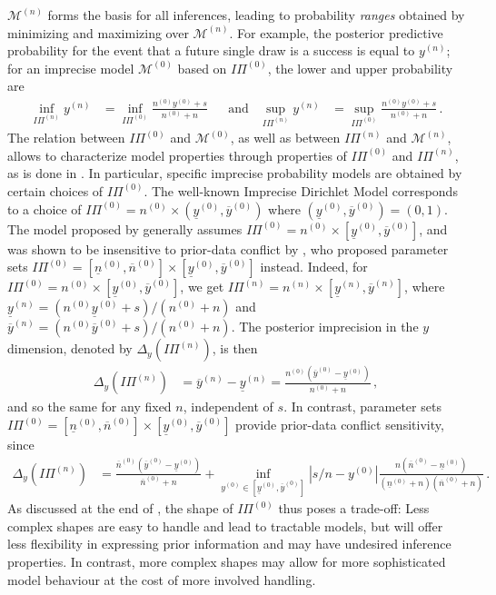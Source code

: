 \documentclass[runningheads,a4paper]{llncs}
\newcommand{\uz}{^{(0)}} %
\newcommand{\un}{^{(n)}} %
\newcommand{\ul}[1]{\underline{#1}}
\newcommand{\ol}[1]{\overline{#1}}
\def\yz{y\uz}
\def\yn{y\un}
\def\yzl{\ul{y}\uz}
\def\yzu{\ol{y}\uz}
\def\ynl{\ul{y}\un}
\def\ynu{\ol{y}\un}
\def\nz{n\uz}
\def\nn{n\un}
\def\nzl{\ul{n}\uz}
\def\nzu{\ol{n}\uz}
\def\PZ{I\!\!\Pi\uz}
\def\PN{I\!\!\Pi\un}
\def\MZ{\mathcal{M}\uz}
\def\MN{\mathcal{M}\un}
\begin{document}
$\MN$ forms the basis for all inferences,
leading to probability \emph{ranges} obtained by minimizing and maximizing over $\MN$.
For example, %
the posterior predictive probability %
for the event that a future single draw is a success is equal to $\yn$;
for an imprecise model $\MZ$ based on $\PZ$,
the lower and upper probability are
\begin{align*}
\inf_{\PN} \yn &= \inf_{\PZ} \frac{\nz\yz + s}{\nz +n} & &\text{and} &
\sup_{\PN} \yn &= \sup_{\PZ} \frac{\nz\yz + s}{\nz +n}\,.
\end{align*}
%
The relation between $\PZ$ and $\MZ$, as well as between $\PN$ and $\MN$,
allows to characterize model properties through properties of $\PZ$ and $\PN$,
as is done in \cite[\S 3.1.2 -- 3.1.4]{2013:diss-gw}.
In particular, specific imprecise probability models are obtained by certain choices of $\PZ$.
The well-known Imprecise Dirichlet Model \cite{1996:walley::idm}
corresponds to a choice of $\PZ = \nz \times (\yzl, \yzu)$ where $(\yzl, \yzu) = (0,1)$.
The model proposed by \cite{2005:quaeghebeurcooman} generally assumes $\PZ = \nz \times [\yzl, \yzu]$,
and was shown to be insensitive to prior-data conflict by \cite{Walter2009a},
who proposed parameter sets $\PZ = [\nzl, \nzu] \times [\yzl, \yzu]$ instead.
%
Indeed, for $\PZ = \nz \times [\yzl, \yzu]$, we get $\PN = \nn \times [\ynl, \ynu]$, where
$\ynl = (\nz\yzl + s)/(\nz + n)$ and $\ynu = (\nz\yzu + s)/(\nz + n)$.
The posterior imprecision in the $y$ dimension, denoted by $\Delta_y(\PN)$, is then
\begin{align*}
\Delta_y(\PN) &= \ynu - \ynl = \frac{\nz (\yzu - \yzl)}{\nz +n}\,,
\end{align*}
and so the same for any fixed $n$, independent of $s$.
In contrast, parameter sets $\PZ = [\nzl, \nzu] \times [\yzl, \yzu]$
provide prior-data conflict sensitivity, since
\begin{align*}
\Delta_y(\PN) &= \frac{\nzu (\yzu - \yzl)}{\nzu + n} %
               + \inf_{\yz \in [\yzl,\yzu]} |s/n - \yz| \frac{n (\nzu - \nzl)}{(\nzl + n)(\nzu + n)}\,.
\end{align*}
%
As discussed at the end of \cite[\S 3.1.4]{2013:diss-gw},
the shape of $\PZ$ thus poses a trade-off:
Less complex shapes are easy to handle and lead to tractable models,
but will offer less flexibility in expressing prior information
and may have undesired inference properties.
In contrast, more complex shapes may allow for more sophisticated model behaviour
at the cost of more involved handling.
\end{document}
